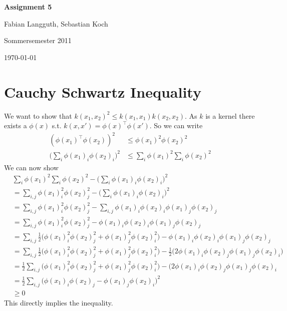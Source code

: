



\begin{center}
    \huge {\bf Assignment 5}
    
    \small Fabian Langguth, Sebastian Koch
    
    Sommersemester 2011
    
    \today
\end{center}

\section*{Cauchy Schwartz Inequality} %
\label{sec:cauchy_schwartz_inequality}

We want to show that $k(x_1,x_2)^2 \leq k(x_1,x_1)k(x_2,x_2)$. As $k$ is a kernel there exists a $\phi(x)$ s.t. $k(x,x') = \phi(x)^{\top}\phi(x')$. So we can write
\begin{align}
	(\phi(x_1)^{\top}\phi(x_2))^2 &\leq \phi(x_1)^2\phi(x_2)^2 \\
	\bigg(\sum_i \phi(x_1)_i \phi(x_2)_i\bigg)^2 &\leq \sum_i \phi(x_1)^2 \sum_i \phi(x_2)^2
\end{align}
We can now show
\begin{align}
 &	\sum_i \phi(x_1)^2 \sum_i \phi(x_2)^2 - \bigg(\sum_i \phi(x_1)_i \phi(x_2)_i\bigg)^2\\ &= \sum_{i,j} \phi(x_1)_i^2 \phi(x_2)_j^2 -  \bigg(\sum_i \phi(x_1)_i \phi(x_2)_i\bigg)^2 \\
	&= \sum_{i,j} \phi(x_1)_i^2 \phi(x_2)_j^2 -  \sum_{i,j} \phi(x_1)_i \phi(x_2)_i \phi(x_1)_j \phi(x_2)_j \\
	&= \sum_{i,j} \phi(x_1)_i^2 \phi(x_2)_j^2 - \phi(x_1)_i \phi(x_2)_i \phi(x_1)_j \phi(x_2)_j \\
	&= \sum_{i,j} \frac{1}{2}\bigg(\phi(x_1)_i^2 \phi(x_2)_j^2 + \phi(x_1)_j^2 \phi(x_2)_i^2 \bigg) - \phi(x_1)_i \phi(x_2)_i \phi(x_1)_j \phi(x_2)_j \\
	&= \sum_{i,j} \frac{1}{2}\bigg(\phi(x_1)_i^2 \phi(x_2)_j^2 + \phi(x_1)_j^2 \phi(x_2)_i^2 \bigg) - \frac{1}{2}\bigg(2\phi(x_1)_i \phi(x_2)_j \phi(x_1)_j \phi(x_2)_i \bigg)\\
	&= \frac{1}{2}\sum_{i,j} (\phi(x_1)_i^2 \phi(x_2)_j^2 + \phi(x_1)_j^2 \phi(x_2)_i^2 \bigg) - (2\phi(x_1)_i \phi(x_2)_j \phi(x_1)_j \phi(x_2)_i \\
	&= \frac{1}{2} \sum_{i,j} \bigg(\phi(x_1)_i \phi(x_2)_j - \phi(x_1)_j \phi(x_2)_i\bigg)^2\\
	&\geq 0
\end{align}
This directly implies the inequality.




